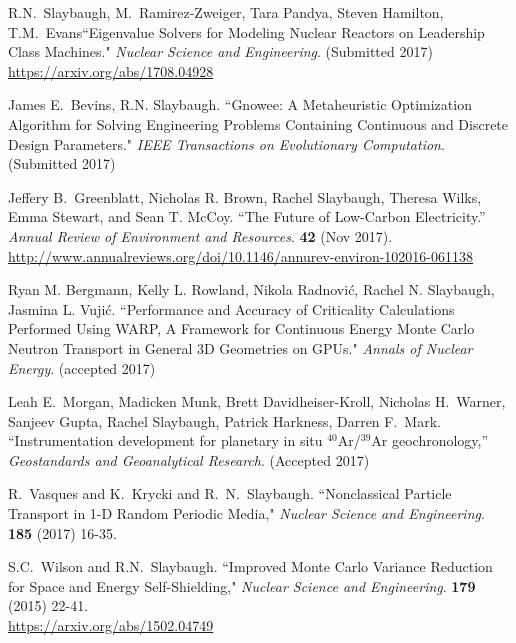 \begin{bibsection}
\item R.N.\ Slaybaugh, M.\ Ramirez-Zweiger, Tara Pandya, Steven Hamilton, T.M.\ Evans``Eigenvalue Solvers for Modeling Nuclear Reactors on Leadership Class Machines." \textit{Nuclear Science and Engineering}. (Submitted 2017)\\
\url{https://arxiv.org/abs/1708.04928}

\item  James E.\ Bevins, R.N. Slaybaugh. ``Gnowee: A Metaheuristic Optimization Algorithm for Solving Engineering Problems Containing Continuous and Discrete Design Parameters." \textit{IEEE Transactions on Evolutionary Computation}. (Submitted 2017)

\item Jeffery B.\ Greenblatt, Nicholas R. Brown, Rachel Slaybaugh, Theresa Wilks, Emma Stewart, and Sean T. McCoy. ``The Future of Low-Carbon Electricity.'' \textit{Annual Review of Environment and Resources}. \textbf{42} (Nov 2017). \\
\url{http://www.annualreviews.org/doi/10.1146/annurev-environ-102016-061138}

\item Ryan M. Bergmann, Kelly L. Rowland, Nikola Radnovi\'c, Rachel N. Slaybaugh, Jasmina L. Vuji\'c. ``Performance and Accuracy of Criticality Calculations Performed Using WARP, A Framework for Continuous Energy Monte Carlo Neutron Transport in General 3D Geometries on GPUs." \textit{Annals of Nuclear Energy}. (accepted 2017)

\item Leah E.\ Morgan, Madicken Munk, Brett Davidheiser-Kroll, Nicholas H.\ Warner, Sanjeev Gupta, Rachel Slaybaugh, Patrick Harkness, Darren F.\ Mark. ``Instrumentation development for planetary in situ $^{40}$Ar/$^{39}$Ar geochronology,'' \textit{Geostandards and Geoanalytical Research}. (Accepted 2017)

\item R.\ Vasques and K.\ Krycki and R.\ N.\ Slaybaugh. ``Nonclassical Particle Transport in 1-D Random Periodic Media," \textit{Nuclear Science and Engineering}.  \textbf{185} (2017) 16-35.

\item S.C.\ Wilson and R.N.\ Slaybaugh. ``Improved Monte Carlo Variance Reduction for Space and Energy Self-Shielding," \textit{Nuclear Science and Engineering}. \textbf{179} (2015) 22-41.\\
\url{https://arxiv.org/abs/1502.04749}


\end{bibsection}
